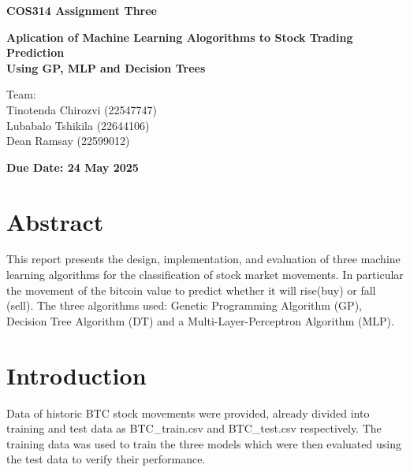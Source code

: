 \documentclass[a4paper,12pt]{article}
\begin{document}

\begin{center}            
    {\LARGE\textbf{COS314 Assignment Three}}\\
    
    \vspace{4cm}
    
    {\Large\textbf{Aplication of Machine Learning Alogorithms to Stock Trading Prediction}}\\
    \vspace{0.5cm}
    {\large\textbf{Using GP, MLP and Decision Trees}}\\
    
    \vspace{12cm}

    {\large Team:}\\
    \vspace{0.3cm}
    {\large Tinotenda Chirozvi (22547747)}\\
    {\large Lubabalo Tshikila (22644106)}\\
    {\large Dean Ramsay (22599012)}\\
    
    \vspace{2cm}
    
    {\large\textbf{Due Date: 24 May 2025}}\\
    
\end{center}

\clearpage
{} %

\section*{Abstract}
This report presents the design, implementation, and evaluation of three machine learning algorithms for the classification of stock market movements. In particular the movement of the bitcoin value to predict whether it will rise(buy) or fall (sell). The three algorithms used: Genetic Programming Algorithm (GP), Decision Tree Algorithm (DT) and a Multi-Layer-Perceptron Algorithm (MLP).

\section{Introduction}
Data of historic BTC stock movements were provided, already divided into training and test data as BTC\_train.csv and BTC\_test.csv respectively.
The training data was used to train the three models which were then evaluated using the test data to verify their performance.
\end{document}
